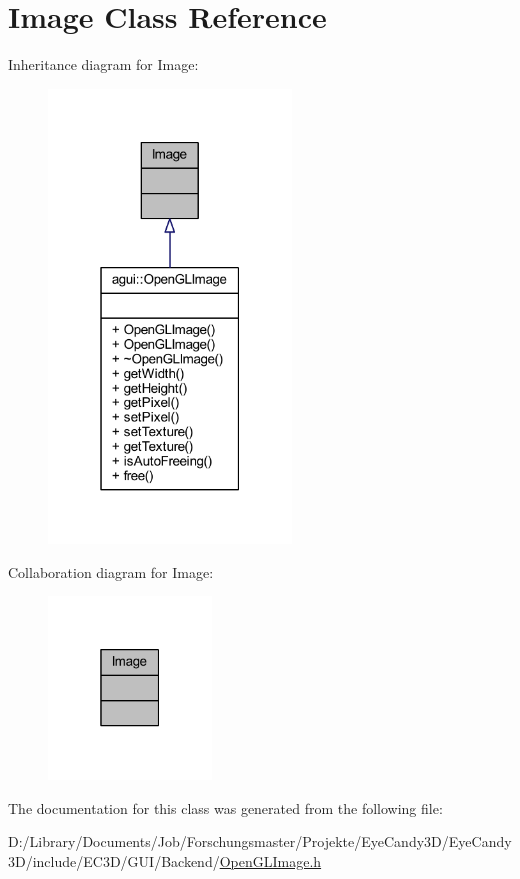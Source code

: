 \hypertarget{class_image}{}\section{Image Class Reference}
\label{class_image}


Inheritance diagram for Image\+:\nopagebreak
\begin{figure}[H]
\begin{center}
\leavevmode
\includegraphics[width=183pt]{class_image__inherit__graph}
\end{center}
\end{figure}


Collaboration diagram for Image\+:\nopagebreak
\begin{figure}[H]
\begin{center}
\leavevmode
\includegraphics[width=123pt]{class_image__coll__graph}
\end{center}
\end{figure}


The documentation for this class was generated from the following file\+:\begin{DoxyCompactItemize}
\item 
D\+:/\+Library/\+Documents/\+Job/\+Forschungsmaster/\+Projekte/\+Eye\+Candy3\+D/\+Eye\+Candy3\+D/include/\+E\+C3\+D/\+G\+U\+I/\+Backend/\mbox{\hyperlink{_open_g_l_image_8h}{Open\+G\+L\+Image.\+h}}\end{DoxyCompactItemize}
